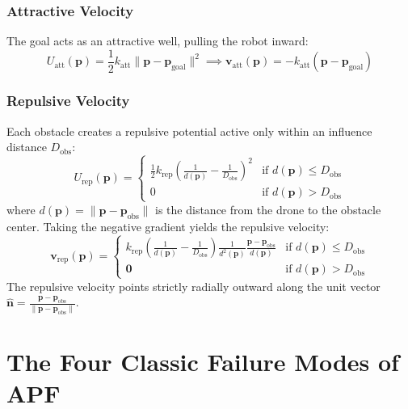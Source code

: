 \documentclass[11pt,a4paper]{article}
\begin{document}
\subsubsection{Attractive Velocity}
The goal acts as an attractive well, pulling the robot inward:
\begin{equation}
U_{\mathrm{att}}(\mathbf{p}) = \frac{1}{2} k_{\mathrm{att}} \|\mathbf{p} - \mathbf{p}_{\mathrm{goal}}\|^2 \implies \mathbf{v}_{\mathrm{att}}(\mathbf{p}) = -k_{\mathrm{att}}(\mathbf{p} - \mathbf{p}_{\mathrm{goal}})
\end{equation}

\subsubsection{Repulsive Velocity}
Each obstacle creates a repulsive potential active only within an influence distance $D_{\mathrm{obs}}$:
\begin{equation}
U_{\mathrm{rep}}(\mathbf{p}) = \begin{cases}
\frac{1}{2} k_{\mathrm{rep}} \left( \frac{1}{d(\mathbf{p})} - \frac{1}{D_{\mathrm{obs}}} \right)^2 & \text{if } d(\mathbf{p}) \le D_{\mathrm{obs}} \\
0 & \text{if } d(\mathbf{p}) > D_{\mathrm{obs}}
\end{cases}
\end{equation}
where $d(\mathbf{p}) = \|\mathbf{p} - \mathbf{p}_{\mathrm{obs}}\|$ is the distance from the drone to the obstacle center. Taking the negative gradient yields the repulsive velocity:
\begin{equation}
\mathbf{v}_{\mathrm{rep}}(\mathbf{p}) = \begin{cases}
k_{\mathrm{rep}} \left( \frac{1}{d(\mathbf{p})} - \frac{1}{D_{\mathrm{obs}}} \right) \frac{1}{d^2(\mathbf{p})} \frac{\mathbf{p} - \mathbf{p}_{\mathrm{obs}}}{d(\mathbf{p})} & \text{if } d(\mathbf{p}) \le D_{\mathrm{obs}} \\
\mathbf{0} & \text{if } d(\mathbf{p}) > D_{\mathrm{obs}}
\end{cases}
\end{equation}
The repulsive velocity points strictly radially outward along the unit vector $\hat{\mathbf{n}} = \frac{\mathbf{p} - \mathbf{p}_{\mathrm{obs}}}{\|\mathbf{p} - \mathbf{p}_{\mathrm{obs}}\|}$.

\section{The Four Classic Failure Modes of APF}
\end{document}
